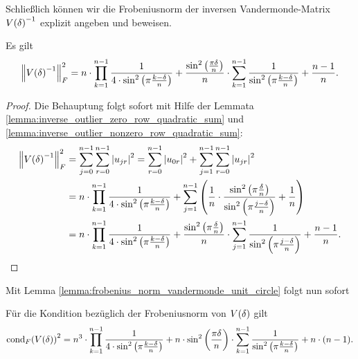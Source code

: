\noindent Schließlich können wir die Frobeniusnorm der inversen Vandermonde-Matrix
$\Vand{\delta}^{-1}$ explizit angeben und beweisen.
\begin{theorem}
    Es gilt
    \begin{equation}
        \norm{ \Vand{\delta}^{-1} }_F^2
        = n \cdot \prod_{k=1}^{n-1} \frac{1}{4 \cdot \sin^2 \left( \pi \frac{k-\delta}{n} \right)}
          + \frac{\sin^2 \left( \frac{\pi \delta}{n} \right)}{n} \cdot \sum_{k=1}^{n-1} \frac{1}{\sin^2 \left( \pi \frac{k-\delta}{n} \right)}
          + \frac{n-1}{n}.
    \end{equation}
\end{theorem}
\begin{proof}
    Die Behauptung folgt sofort mit Hilfe der Lemmata
    \ref{lemma:inverse_outlier_zero_row_quadratic_sum} und
    \ref{lemma:inverse_outlier_nonzero_row_quadratic_sum}:
    \[
        \begin{split}
            \norm{ \Vand{\delta}^{-1} }_F^2
            &= \sum_{j=0}^{n-1} \sum_{r=0}^{n-1} \abs{u_{jr}}^2
             = \sum_{r=0}^{n-1} \abs{u_{0r}}^2
             + \sum_{j=1}^{n-1} \sum_{r=0}^{n-1} \abs{u_{jr}}^2\\
            &= n \cdot \prod_{k=1}^{n-1} \frac{1}{4 \cdot \sin^2 \left( \pi \frac{k-\delta}{n} \right)}
             + \sum_{j=1}^{n-1} \left( \frac{1}{n} \cdot \frac{\sin^2 \left( \pi \frac{\delta}{n} \right)}{\sin^2 \left( \pi \frac{j - \delta}{n} \right)}
             + \frac{1}{n} \right)\\
            &= n \cdot \prod_{k=1}^{n-1} \frac{1}{4 \cdot \sin^2 \left( \pi \frac{k-\delta}{n} \right)}
             + \frac{\sin^2 \left( \pi \frac{\delta}{n} \right)}{n} \cdot \sum_{j=1}^{n-1} \frac{1}{\sin^2 \left( \pi \frac{j - \delta}{n} \right)}
             + \frac{n-1}{n}.
         \end{split}
     \]
\end{proof}

\noindent Mit Lemma \ref{lemma:frobenius_norm_vandermonde_unit_circle} folgt nun sofort
\begin{corollary}
    Für die Kondition bezüglich der Frobeniusnorm von $\Vand{\delta}$ gilt
    \begin{equation*}
        \cond[F]{ \Vand{\delta} }^2
        = n^3 \cdot \prod_{k=1}^{n-1} \frac{1}{4 \cdot \sin^2 \left( \pi \frac{k-\delta}{n} \right)}
          + n \cdot \sin^2 \left( \frac{\pi \delta}{n} \right) \cdot \sum_{k=1}^{n-1} \frac{1}{\sin^2 \left( \pi \frac{k-\delta}{n} \right)}
          + n \cdot (n-1).
    \end{equation*}
\end{corollary}
